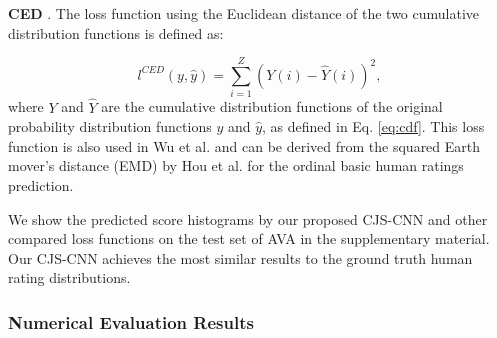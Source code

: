 \documentclass[letterpaper]{article} %
\begin{document}
\textbf{CED} \cite{WuICCV2011,HouArXiv2016}. The loss function using the Euclidean distance of the two cumulative distribution functions is defined as:

\begin{equation}
l^{CED}(y,\hat{y}) = \sum_{i=1}^{Z}(Y(i)-\hat{Y}(i))^2,
\label{eq:CED}
\end{equation}
where $Y$ and $\hat{Y}$ are the cumulative distribution functions of the original probability distribution functions $y$ and $\hat{y}$, as defined in Eq. \ref{eq:cdf}. This loss function is also used in Wu et al. \cite{WuICCV2011} and can be derived from the squared Earth mover's distance (EMD) by Hou et al.  \cite{HouArXiv2016} for the ordinal basic human ratings prediction.


%

We show the predicted score histograms by our proposed CJS-CNN and other compared loss functions on the test set of AVA in the supplementary material. Our CJS-CNN achieves the most similar results to the ground truth human rating distributions.




%
%



%



\subsubsection{Numerical Evaluation Results} 
%
%
\end{document}
